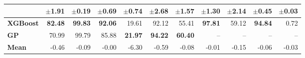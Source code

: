 \begin{table}[!htbp]
\begin{tabular}{lrrrrrrrrrr}
 & $\pm$1.91 & $\pm$0.19 & $\pm$0.69 & $\pm$0.74 & $\pm$2.68 & $\pm$1.57 & $\pm$1.30 & $\pm$2.14 & $\pm$0.45 & $\pm$0.03 \\
\midrule
\textbf{XGBoost} & \textbf{82.48} & \textbf{99.83} & \textbf{92.06} & 19.61 & 92.12 & 55.41 & \textbf{97.81} & 59.12 & \textbf{94.84} & 0.72 \\
\midrule
\textbf{GP} & 70.99 & 99.79 & 85.88 & \textbf{21.97} & \textbf{94.22} & \textbf{60.40} & -- & -- & -- & -- \\
\midrule
\textbf{Mean} & -0.46 & -0.09 & -0.00 & -6.30 & -0.59 & -0.08 & -0.01 & -0.15 & -0.06 & -0.03 \\
\bottomrule
\end{tabular}
\end{table}